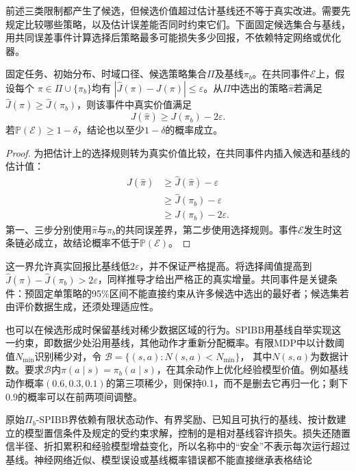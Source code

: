 前述三类限制都产生了候选，但候选价值超过估计基线还不等于真实改进。需要先规定比较哪些策略，以及估计误差能否同时约束它们。下面固定候选集合与基线，用共同误差事件计算选择后策略最多可能损失多少回报，不依赖特定网络或优化器。

\begin{theorem}[共同误差事件上的基线性能控制]
  \label{thm:rl-information-improvement}
  固定任务、初始分布、时域口径、候选策略集合$\Pi$及基线$\pi_b$。在共同事件$\mathcal E$上，假设每个
  $\pi\in\Pi\cup\{\pi_b\}$均有
  $|\widehat J(\pi)-J(\pi)|\leq\varepsilon$。从$\Pi$中选出的策略$\widehat\pi$若满足
  $\widehat J(\widehat\pi)\geq\widehat J(\pi_b)$，则该事件中真实价值满足
  \[
    J(\widehat\pi)\geq J(\pi_b)-2\varepsilon.
  \]
  若$\mathbb P(\mathcal E)\geq1-\delta$，结论也以至少$1-\delta$的概率成立。
\end{theorem}

\begin{proof}
  为把估计上的选择规则转为真实价值比较，在共同事件内插入候选和基线的估计值：
  \[
  \begin{aligned}
    J(\widehat\pi)
    &\geq\widehat J(\widehat\pi)-\varepsilon\\
    &\geq\widehat J(\pi_b)-\varepsilon\\
    &\geq J(\pi_b)-2\varepsilon.
  \end{aligned}
  \]
  第一、三步分别使用$\widehat\pi$与$\pi_b$的共同误差界，第二步使用选择规则。事件$\mathcal E$发生时这条链必成立，故结论概率不低于$\mathbb P(\mathcal E)$。
\end{proof}

这一界允许真实回报比基线低$2\varepsilon$，并不保证严格提高。将选择阈值提高到
$\widehat J(\widehat\pi)-\widehat J(\pi_b)>2\varepsilon$，同样推导才给出严格正的真实增量。共同事件是关键条件：预固定单策略的95\%区间不能直接约束从许多候选中选出的最好者；候选集若由评价数据生成，还须处理适应性。

也可以在候选形成时保留基线对稀少数据区域的行为。SPIBB用基线自举实现这一约束，即数据少处沿用基线，其他动作才重新分配概率。有限MDP中以计数阈值$N_{\min}$识别稀少对，令
$\mathcal B=\{(s,a):N(s,a)<N_{\min}\}$，
其中$N(s,a)$为数据计数。要求$\mathcal B$内$\pi(a\mid s)=\pi_b(a\mid s)$，在其余动作上优化经验模型价值。例如基线动作概率$(0.6,0.3,0.1)$的第三项稀少，则保持0.1，而不是删去它再归一化；剩下0.9的概率可以在前两项间调整。

原始$\Pi_b$-SPIBB界依赖有限状态动作、有界奖励、已知且可执行的基线、按计数建立的模型置信条件及规定的受约束求解，控制的是相对基线容许损失。损失还随置信半径、折扣累积和经验模型增益变化，所以名称中的“安全”不表示每次运行超过基线。神经网络近似、模型误设或基线概率错误都不能直接继承表格结论

